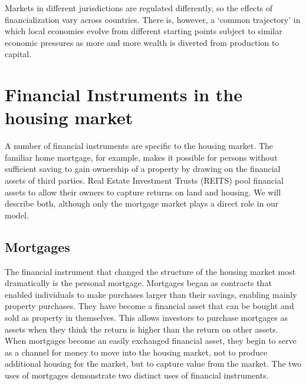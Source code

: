 Markets in different jurisdictions are regulated differently, so the effects of financialization vary across countries. There is, however, a ‘common trajectory’ \cite{hayCommonTrajectoriesVariable2004}\cite{aalbersConversationLandRent2018} in which local economies evolve from different starting points subject to similar economic pressures as more and more wealth is diverted from production to capital.




\section{Financial Instruments in the housing market}
A number of financial instruments are specific to the housing market. The familiar home mortgage, for example, makes it possible for persons without sufficient saving to gain ownership of a property by drawing on the financial assets of third parties. Real Estate Investment Trusts (REITS) pool financial assets to allow their owners to capture returns on land and housing. We will describe both, although only the mortgage market plays a direct role in our model. 



\subsection{Mortgages}


The financial instrument that changed the structure of the housing market most dramatically is the personal mortgage. Mortgages began as contracts that enabled individuals to make purchases larger than their savings, enabling mainly property purchases. They have become a financial asset that can be bought and sold as property in themselves. This allows investors to purchase mortgages as assets when they think the return is higher than the return on other assets.  When mortgages become an easily exchanged financial asset, they begin to serve as a channel for money to move into the housing market, not to produce additional housing for the market, but to capture value from the market. The two uses of mortgages demonstrate two distinct uses of financial instruments.  

